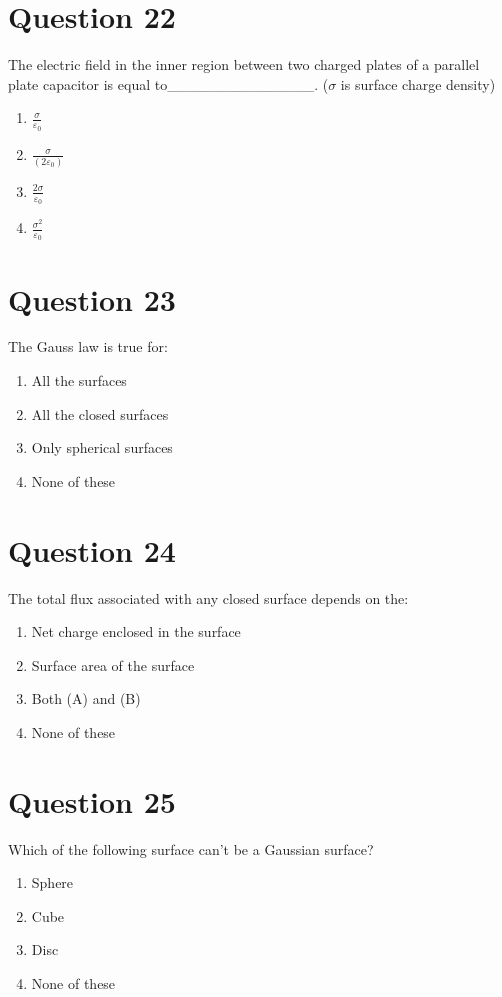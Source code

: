 \documentclass{article}
\begin{document}
\section*{Question 22}
The electric field in the inner region between two charged plates of a parallel plate capacitor is equal to______________. (\(\sigma\) is surface charge density)
\begin{enumerate}[label=(\alph*)]
\item \(\frac{\sigma }{ \varepsilon_0}\)
\item \(\frac{\sigma }{\left(2 \varepsilon_0\right)}\)
\item \(\frac{2 \sigma }{ \varepsilon_0}\)
\item \(\frac{\sigma^2 }{\varepsilon_0}\)
\end{enumerate}
\newpage
\section*{Question 23}
The Gauss law is true for:
\begin{enumerate}[label=(\alph*)]
\item All the surfaces
\item All the closed surfaces
\item Only spherical surfaces
\item None of these
\end{enumerate}
\newpage
\section*{Question 24}
The total flux associated with any closed surface depends on the:
\begin{enumerate}[label=(\alph*)]
\item Net charge enclosed in the surface
\item Surface area of the surface
\item Both (A) and (B)
\item None of these
\end{enumerate}
\newpage
\section*{Question 25}
Which of the following surface can't be a Gaussian surface?
\begin{enumerate}[label=(\alph*)]
\item Sphere
\item Cube
\item Disc
\item None of these
\end{enumerate}
\newpage
\end{document}

